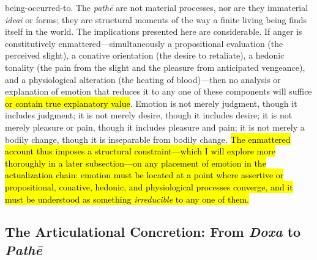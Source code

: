 \documentclass{article}
\begin{document}
being-occurred-to. The \textit{pathē} are not material processes, nor are they immaterial \textit{ideai} or forms; they are structural moments of the way a finite living being finds itself in the world. The implications presented here are considerable. If anger is constitutively enmattered---simultaneously a propositional evaluation (the perceived slight), a conative orientation (the desire to retaliate), a hedonic tonality (the pain from the slight and the pleasure from anticipated vengeance), and a physiological alteration (the heating of blood)---then no analysis or explanation of emotion that reduces it to any one of these components will suffice \hl{or contain true explanatory value}. Emotion is not merely judgment, though it includes judgment; it is not merely desire, though it includes desire; it is not merely pleasure or pain, though it includes pleasure and pain; it is not merely a bodily change, though it is inseparable from bodily change. \hl{The enmattered account thus imposes a structural constraint---which I will explore more thoroughly in a later subsection---on any placement of emotion in the actualization chain: emotion must be located at a point where assertive or propositional, conative, hedonic, and physiological processes converge, and it must be understood as something \textit{irreducible} to any one of them.}

\subsection{The Articulational Concretion: From \textit{Doxa} to \textit{Pathē}}
\end{document}

